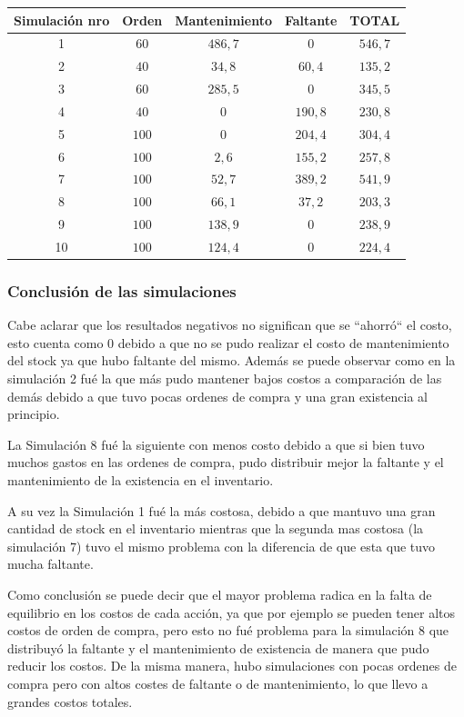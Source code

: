 \begin{tabular}{||c||c|c|c|c||}
    \hline \hline
    Simulación nro & Orden & Mantenimiento & Faltante & TOTAL\\
    \hline \hline
    1 & $60$ & $486,7$ & $0$ & $546,7$\\
    \hline
    2 & $40$ & $34,8$ & $60,4$ & $135,2$\\
    \hline
    3 & $60$ & $285,5$ & $0$ & $345,5$\\
    \hline
    4 & $40$ & $0$ & $190,8$ & $230,8$\\
    \hline
    5 & $100$ & $0$ & $204,4$ & $304,4$\\
    \hline
    6 & $100$ & $2,6$ & $155,2$ & $257,8$\\
    \hline
    7 & $100$ & $52,7$ & $389,2$ & $541,9$\\
    \hline
    8 & $100$ & $66,1$ & $37,2$ & $203,3$\\
    \hline
    9 & $100$ & $138,9$ & $0$ & $238,9$\\
    \hline
    10 & $100$ & $124,4$ & $0$ &$224,4$\\
    \hline \hline
\end{tabular}

\subsubsection{Conclusión de las simulaciones}\label{subsubsec:conclusiones}
Cabe aclarar que los resultados negativos no significan que se ``ahorró`` el costo, esto cuenta como 0 debido a que no se pudo realizar el costo de mantenimiento del stock ya que hubo faltante del mismo.
Además se puede observar como en la simulación 2 fué la que más pudo mantener bajos costos a comparación de las demás debido a que tuvo pocas ordenes de compra y una gran existencia al principio.

La Simulación 8 fué la siguiente con menos costo debido a que si bien tuvo muchos gastos en las ordenes de compra, pudo distribuir mejor la faltante y el mantenimiento de la existencia en el inventario.

A su vez la Simulación 1 fué la más costosa, debido a que mantuvo una gran cantidad de stock en el inventario mientras que la segunda mas costosa (la simulación 7) tuvo el mismo problema con la diferencia de que esta que tuvo mucha faltante.

Como conclusión se puede decir que el mayor problema radica en la falta de equilibrio en los costos de cada acción, ya que por ejemplo se pueden tener altos costos de orden de compra, pero esto no fué problema para la simulación 8 que distribuyó la faltante y el mantenimiento de existencia de manera que pudo reducir los costos.
De la misma manera, hubo simulaciones con pocas ordenes de compra pero con altos costes de faltante o de mantenimiento, lo que llevo a grandes costos totales.
